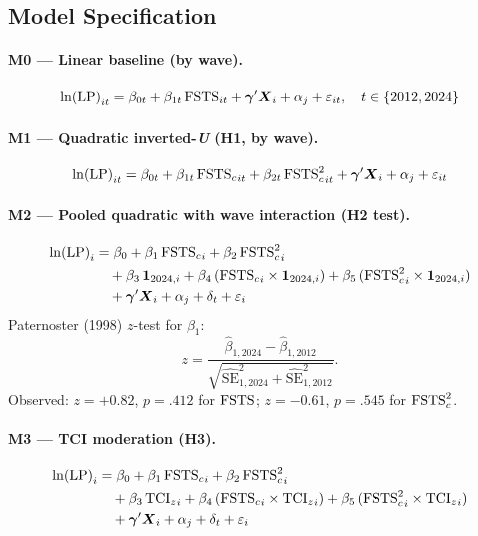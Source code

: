 \documentclass[12pt,a4paper]{article}
\begin{document}
\subsection{Model Specification}

\paragraph{M0 --- Linear baseline (by wave).}
\begin{equation}
  {\ln(\mathrm{LP})}_{it} = \beta_{0t} + \beta_{1t}\,{\mathrm{FSTS}}_{it}
    + \boldsymbol{\gamma}'\boldsymbol{X}_{i} + {\alpha_{j}} + \varepsilon_{it},
  \quad t \in \{2012, 2024\}
  \label{eq:M0_p5}
\end{equation}

\paragraph{M1 --- Quadratic inverted-\textit{U} (H1, by wave).}
\begin{equation}
  {\ln(\mathrm{LP})}_{it} = \beta_{0t} + \beta_{1t}\,{\mathrm{FSTS}_{c}}_{it}
    + \beta_{2t}\,{\mathrm{FSTS}_{c}^{2}}_{it}
    + \boldsymbol{\gamma}'\boldsymbol{X}_{i} + {\alpha_{j}} + \varepsilon_{it}
  \label{eq:M1_p5}
\end{equation}

\paragraph{M2 --- Pooled quadratic with wave interaction (H2 test).}
\begin{align}
  {\ln(\mathrm{LP})}_{i} &= \beta_{0} + \beta_{1}\,{\mathrm{FSTS}_{c}}_{i} + \beta_{2}\,{\mathrm{FSTS}_{c}^{2}}_{i}
    \notag \\
    &\quad + \beta_{3}\,\mathbf{1}_{2024,i}
    + \beta_{4}\,({\mathrm{FSTS}_{c}}_{i} \times \mathbf{1}_{2024,i})
    + \beta_{5}\,({\mathrm{FSTS}_{c}^{2}}_{i} \times \mathbf{1}_{2024,i})
    \notag \\
    &\quad + \boldsymbol{\gamma}'\boldsymbol{X}_{i} + {\alpha_{j}} + {\delta_{t}} + \varepsilon_{i}
  \label{eq:M2_p5}
\end{align}
Paternoster (1998) \(z\)-test for \(\beta_{1}\):
\begin{equation}
  z = \frac{\hat{\beta}_{1,2024} - \hat{\beta}_{1,2012}}
    {\sqrt{\widehat{\mathrm{SE}}_{1,2024}^{2}
      + \widehat{\mathrm{SE}}_{1,2012}^{2}}}.
  \label{eq:paternoster}
\end{equation}
Observed: \(z = +0.82\), \(p = .412\) for \({\mathrm{FSTS}}\);
\(z = -0.61\), \(p = .545\) for \({\mathrm{FSTS}_{c}^{2}}\).

\paragraph{M3 --- TCI moderation (H3).}
\begin{align}
  {\ln(\mathrm{LP})}_{i} &= \beta_{0} + \beta_{1}\,{\mathrm{FSTS}_{c}}_{i} + \beta_{2}\,{\mathrm{FSTS}_{c}^{2}}_{i}
    \notag \\
    &\quad + \beta_{3}\,{\mathrm{TCI}_{z}}_{i}
    + \beta_{4}\,({\mathrm{FSTS}_{c}}_{i} \times {\mathrm{TCI}_{z}}_{i})
    + \beta_{5}\,({\mathrm{FSTS}_{c}^{2}}_{i} \times {\mathrm{TCI}_{z}}_{i})
    \notag \\
    &\quad + \boldsymbol{\gamma}'\boldsymbol{X}_{i} + {\alpha_{j}} + {\delta_{t}} + \varepsilon_{i}
  \label{eq:M3_p5}
\end{align}
\end{document}
